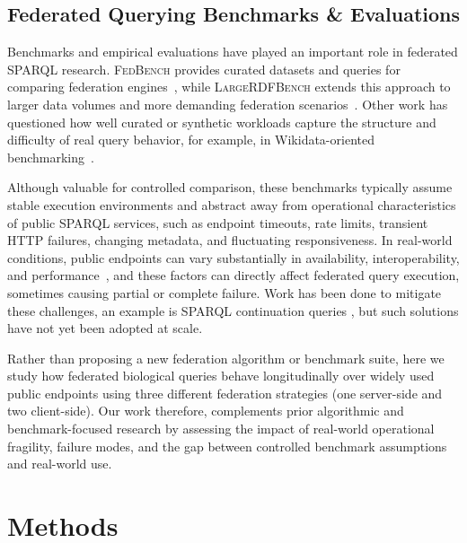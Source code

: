 \documentclass[runningheads]{llncs}
\begin{document}
\subsection{Federated Querying Benchmarks \& Evaluations}\label{sec3.2}
Benchmarks and empirical evaluations have played an important role in federated SPARQL research.
\textsc{FedBench} provides curated datasets and queries for comparing federation engines~\cite{Schmidt2011FedBench,Saleem2014FedBench}, while \textsc{LargeRDFBench} extends this approach to larger data volumes and more demanding federation scenarios~\cite{Saleem2018LargeRDFBench}. 
Other work has questioned how well curated or synthetic workloads capture the structure and difficulty of real query behavior, for example, in Wikidata-oriented benchmarking~\cite{Hernandez2015Wikidata}.

Although valuable for controlled comparison, these benchmarks typically assume stable execution environments and abstract away from operational characteristics of public SPARQL services, such as endpoint timeouts, rate limits, transient HTTP failures, changing metadata, and fluctuating responsiveness.
In real-world conditions, public endpoints can vary substantially in availability, interoperability, and performance~\cite{Vandenbussche2017SPARQLES,kartographi2022}, and these factors can directly affect federated query execution, sometimes causing partial or complete failure.
Work has been done to mitigate these challenges, an example is SPARQL continuation queries \cite{passage2025}, but such solutions have not yet been adopted at scale.

Rather than proposing a new federation algorithm or benchmark suite, here we study how federated biological queries behave longitudinally over widely used public endpoints using three different federation strategies (one server-side and two client-side).
Our work therefore, complements prior algorithmic and benchmark-focused research by assessing the impact of real-world operational fragility, failure modes, and the gap between controlled benchmark assumptions and real-world use.


\section{Methods}\label{sec4}
\end{document}
